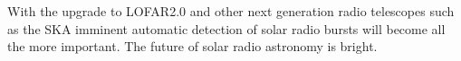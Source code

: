 With the upgrade to LOFAR2.0 and other next generation radio telescopes such as the SKA imminent automatic detection of solar radio bursts will become all the more important. The future of solar radio astronomy is bright.














